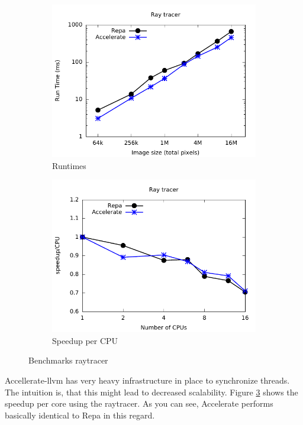 \documentclass[a4paper,bibliography=totocnumbered,parskip,headsepline]{scrbook}
\begin{document}
\begin{figure}
\centering
\begin{subfigure}[t]{0.8\linewidth}
    \centering
    \includegraphics[width=\textwidth]{images/benchmarks/ray/ray}
    \caption{Runtimes}
    \label{fig:ray_bench}
\end{subfigure}
\begin{subfigure}[t]{0.8\linewidth}
    \centering
    \includegraphics[width=\textwidth]{images/benchmarks/ray/ray-scale}
    \caption{Speedup per CPU}
    \label{fig:ray_scale}
\end{subfigure}
\caption{Benchmarks raytracer}
\end{figure}

\newpage
Accellerate-llvm has very heavy infrastructure in place to synchronize threads.
The intuition is, that this might lead to decreased scalability.
Figure \ref{fig:ray_scale} shows the speedup per core using the raytracer.
As you can see, Accelerate performs basically identical to Repa in this regard.
\end{document}
